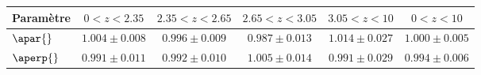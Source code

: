 \begin{table}[h]
\begin{tabular}{lccccc}
\toprule
Param\`etre  & $\num{0} < z < \num{2.35}$ & $\num{2.35} < z < \num{2.65}$ & $\num{2.65} < z < \num{3.05}$ & $\num{3.05} < z < \num{10}$  & $\num{0} < z < \num{10}$ \\
\midrule
$\apar{} $ & $ 1.004 \pm 0.008$ & $ 0.996 \pm 0.009$ & $ 0.987 \pm 0.013$ & $ 1.014 \pm 0.027$ & $ 1.000 \pm 0.005$ \\
$\aperp{} $ & $ 0.991 \pm 0.011$ & $ 0.992 \pm 0.010$ & $ 1.005 \pm 0.014$ & $ 0.991 \pm 0.029$ & $ 0.994 \pm 0.006$ \\

\end{tabular}
\end{table}
